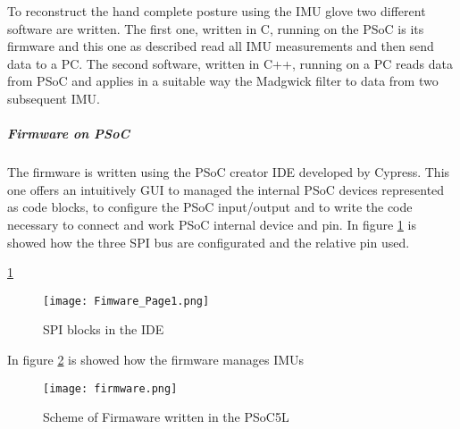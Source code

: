 To reconstruct the hand complete posture using the IMU glove two different software are written. The first one, written in C, running on the PSoC is its firmware and this one as described read all IMU measurements and then send data to a PC.
The second software, written in C++, running on a PC reads data from PSoC and applies in a suitable way the Madgwick filter to data from two subsequent IMU.

\subparagraph{Firmware on PSoC}

The firmware is written using the PSoC creator IDE developed by Cypress. This one offers an intuitively GUI to
managed the internal PSoC devices represented as code blocks, to configure the PSoC input/output and to write the code necessary to connect and work PSoC internal device and pin.%
In figure \ref{fig:firmwarepage1} is showed how the three SPI bus are configurated and the relative pin used.%

\ref{fig:firmwarepage1}
\begin{figure}[h]
\centering
\texttt{[image: Fimware\_Page1.png]}
\caption{SPI blocks in the IDE}
\label{fig:firmwarepage1}
\end{figure}  

In figure \ref{fig:psocfirmware} is showed how the firmware manages IMUs %

\begin{figure}[h]
\centering
\texttt{[image: firmware.png]}
\caption{Scheme of Firmaware written in the PSoC5L}
\label{fig:psocfirmware}
\end{figure}  

